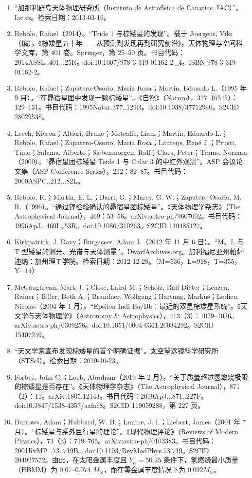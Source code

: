 \begin{enumerate}
\item “加那利群岛天体物理研究所（Instituto de Astrofísica de Canarias, IAC）”。Iac.es。检索日期：2013-03-16。
\item Rebolo, Rafael（2014）。“Teide 1 与棕矮星的发现”。载于 Joergens, Viki（编），《棕矮星五十年——从预测到发现再到研究前沿》。天体物理与空间科学文库，第 401 卷。Springer，第 25–50 页。书目代码：2014ASSL..401...25R。doi:10.1007/978-3-319-01162-2_4。ISBN 978-3-319-01162-2。
\item Rebolo, Rafael；Zapatero-Osorio, María Rosa；Martín, Eduardo L.（1995 年 9 月）。“在昴宿星团中发现一颗棕矮星”。《自然》（Nature），377（6545）：129–131。书目代码：1995Natur.377..129R。doi:10.1038/377129a0。S2CID 28029538。
\item Leech, Kieron；Altieri, Bruno；Metcalfe, Liam；Martín, Eduardo L.；Rebolo, Rafael；Zapatero-Osorio, María Rosa；Laureijs, René J.；Prusti, Timo；Salama, Alberto；Siebenmorgen, Ralf；Claes, Peter；Trams, Norman（2000）。“昴宿星团棕矮星 Teide 1 与 Calar 3 的中红外观测”。ASP 会议论文集（ASP Conference Series），212：82–87。书目代码：2000ASPC..212...82L。
\item Rebolo, R.；Martín, E. L.；Basri, G.；Marcy, G. W.；Zapatero-Osorio, M. R.（1996）。“通过锂检验确认的昴宿星团棕矮星”。《天体物理学杂志》（The Astrophysical Journal），469：53–56。arXiv:astro-ph/9607002。书目代码：1996ApJ...469L..53R。doi:10.1086/310263。S2CID 119485127。
\item Kirkpatrick, J. Davy；Burgasser, Adam J.（2012 年 11 月 6 日）。“M、L 与 T 型矮星的测光、光谱与天体测量”。DwarfArchives.org。加利福尼亚州帕萨迪纳：加州理工学院。检索日期：2012-12-28。（M=536，L=918，T=355，Y=14）
\item McCaughrean, Mark J.；Close, Laird M.；Scholz, Ralf-Dieter；Lenzen, Rainer；Biller, Beth A.；Brandner, Wolfgang；Hartung, Markus；Lodieu, Nicolas（2004 年 1 月）。“Epsilon Indi Ba/Bb：最近的双星棕矮星系统”。《天文学与天体物理学》（Astronomy & Astrophysics），413（3）：1029–1036。arXiv:astro-ph/0309256。doi:10.1051/0004-6361:20034292。S2CID 15407249。
\item “天文学家宣布发现棕矮星的首个明确证据”。太空望远镜科学研究所（STScI）。检索日期：2019-10-23。
\item Forbes, John C.；Loeb, Abraham（2019 年 2 月）。“关于质量超过氢燃烧极限的棕矮星是否存在”。《天体物理学杂志》（The Astrophysical Journal），871（2）：11。arXiv:1805.12143。书目代码：2019ApJ...871..227F。doi:10.3847/1538-4357/aafac8。S2CID 119059288，第 227 页。
\item Burrows, Adam；Hubbard, W. B.；Lunine, J. I.；Liebert, James（2001 年 7 月）。“棕矮星与系外巨行星的理论”。《现代物理评论》（Reviews of Modern Physics），73（3）：719–765。arXiv:astro-ph/0103383。书目代码：2001RvMP...73..719B。doi:10.1103/RevModPhys.73.719。S2CID 204927572。由此，在太阳金属丰度且 $Y_\alpha = 50.25$ 条件下，氢燃烧最小质量（HBMM）为 0.07–0.074 $M_\odot$，而在零金属丰度情况下为 0.092$M_\odot$。

\end{enumerate}
